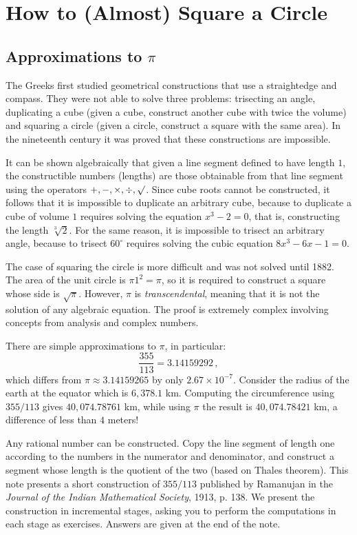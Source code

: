 
\chapter{How to (Almost) Square a Circle}

\section{Approximations to $\pi$}

The Greeks first studied geometrical constructions that use a straightedge and compass. They were not able to solve three problems: trisecting an angle, duplicating a cube (given a cube, construct another cube with twice the volume) and squaring a circle (given a circle, construct a square with the same area). In the nineteenth century it was proved that these constructions are impossible.

It can be shown algebraically that given a line segment defined to have length $1$, the constructible numbers (lengths) are those obtainable from that line segment using the operators $+,-,\times,\div,\surd$. Since cube roots cannot be constructed, it follows that it is impossible to duplicate an arbitrary cube, because to duplicate a cube of volume $1$ requires solving the equation $x^3-2=0$, that is, constructing the length $\sqrt[3]{2}$. For the same reason, it is impossible to trisect an arbitrary angle, because to trisect $60^\circ$ requires solving the cubic equation $8x^3-6x-1=0$.

The case of squaring the circle is more difficult and was not solved until 1882. The area of the unit circle is $\pi 1^2=\pi$, so it is required to construct a square whose side is $\sqrt{\pi}$. However, $\pi$ is \emph{transcendental}, meaning that it is not the solution of any algebraic equation. The proof is extremely complex involving concepts from analysis and complex numbers.

There are simple approximations to $\pi$, in particular:
\[
\frac{355}{113}=3.14159292\,,
\]
which differs from $\pi\approx 3.14159265$ by only $2.67\times 10^{-7}$. Consider the radius of the earth at the equator which is $6,378.1$ km. Computing the circumference using $355/113$ gives $40,074.78761$ km, while using $\pi$ the result is $40,074.78421$ km, a difference of less than $4$ meters!

Any rational number can be constructed. Copy the line segment of length one according to the numbers in the numerator and denominator, and construct a segment whose length is the quotient of  the two (based on Thales theorem). This note presents a short construction of $355/113$ published by Ramanujan in the \emph{Journal of the Indian Mathematical Society}, 1913, p. 138. We present the construction in incremental stages, asking you to perform the computations in each stage as exercises. Answers are given at the end of the note.

